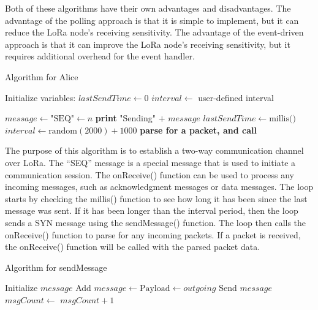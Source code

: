 Both of these algorithms have their own advantages and disadvantages. The advantage of the polling approach is that it is simple to implement, but it can reduce the LoRa node's receiving sensitivity. The advantage of the event-driven approach is that it can improve the LoRa node's receiving sensitivity, but it requires additional overhead for the event handler.
\begin{algorithm}[hbt!]
  \caption{Algorithm for Alice}\label{alg:Alice}
  \begin{algorithmic}
  \State Initialize variables:
      \State $lastSendTime \gets 0$
      \State $interval \gets$ user-defined interval
      
              \State $message \gets \text{"SEQ"} \gets n$
              \State {}
              \State \textbf{print} "Sending" $+$ $message$
              \State $lastSendTime \gets \text{millis()}$
              \State $interval \gets \text{random}(2000) + 1000$ 
          \EndIf
          \State \textbf{parse for a packet, and call} 
      \EndFunction
  \end{algorithmic}
\end{algorithm}
The purpose of this algorithm is to establish a two-way communication channel over LoRa. The “SEQ” message is a special message that is used to initiate a communication session. The onReceive() function can be used to process any incoming messages, such as acknowledgment messages or data messages.
The loop starts by checking the millis() function to see how long it has been since the last message was sent. If it has been longer than the interval period, then the loop sends a SYN message using the sendMessage() function.
The loop then calls the onReceive() function to parse for any incoming packets. If a packet is received, the onReceive() function will be called with the parsed packet data.
\begin{algorithm}[hbt!]
  \caption{Algorithm for sendMessage}\label{alg:sendMessage}
  \begin{algorithmic}
          \State Initialize $message$
          \State Add $message \gets \text{Payload} \gets outgoing$
          \State Send $message$
          \State $msgCount \gets$ $msgCount + 1$
      \EndFunction
  \end{algorithmic}
  \end{algorithm}
